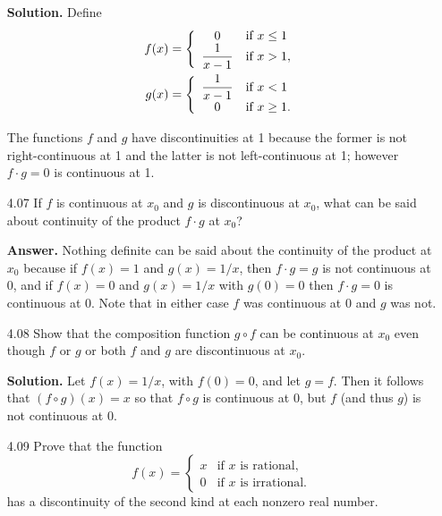 \begin{enumerate}
      \textbf{Solution.} Define
      \begin{align*}
         f(x) &= \left\{\begin{array}{cl}
            0 & \text{if } x \le 1 \\
            \displaystyle\frac{1}{x - 1} & \text{if } x > 1,
         \end{array} \right. \\
         g(x) &= \left\{\begin{array}{cl}
            \displaystyle\frac{1}{x - 1} & \text{if } x < 1 \\            
            0 & \text{if } x \ge 1.
         \end{array} \right.
      \end{align*}

      The functions $f$ and $g$ have discontinuities at 1 because the former
      is not right-continuous at 1 and the latter is not left-continuous at 1;
      however $f \cdot g = 0$ is continuous at 1.
   \item[4.07] If $f$ is continuous at $x_0$ and $g$ is discontinuous at $x_0$,
               what can be said about continuity of the product $f \cdot g$ at
               $x_0$?

      \textbf{Answer.} Nothing definite can be said about the continuity of the
      product at $x_0$ because if $f(x) = 1$ and $g(x) = 1/x$, then
      $f \cdot g = g$ is not continuous at 0, and if $f(x) = 0$ and
      $g(x) = 1/x$ with $g(0) = 0$ then $f \cdot g = 0$ is continuous at 0. Note
      that in either case $f$ was continuous at 0 and $g$ was not.
   \item[4.08] Show that the composition function $g \circ f$ can be continuous
               at $x_0$ even though $f$ or $g$ or both $f$ and $g$ are
               discontinuous at $x_0$.

      \textbf{Solution.} Let $f(x) = 1/x$, with $f(0) = 0$, and let $g = f$.
      Then it follows that $(f \circ g)(x) = x$ so that $f \circ g$ is
      continuous at 0, but $f$ (and thus $g$) is not continuous at 0.
   \item[4.09] Prove that the function
               \begin{equation*}
                  f(x) = \begin{cases}
                     x  & \text{if $x$ is rational}, \\
                     0  & \text{if $x$ is irrational}.
                  \end{cases}
               \end{equation*}
               has a discontinuity of the second kind at each nonzero real
               number.


\end{enumerate}
